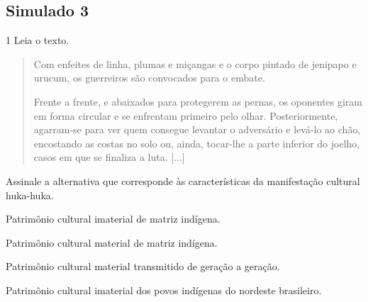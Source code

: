 \begin{escolha}

\chapter{Simulado 3}

\num{1}  Leia o texto.


\begin{quote}
Com enfeites de linha, plumas e miçangas e o corpo pintado de jenipapo e
urucum, os guerreiros são convocados para o embate.

Frente a frente, e abaixados para protegerem as pernas, os oponentes
giram em forma circular e se enfrentam primeiro pelo olhar.
Posteriormente, agarram-se para ver quem consegue levantar o adversário
e levá-lo ao chão, encostando as costas no solo ou, ainda, tocar-lhe a
parte inferior do joelho, casos em que se finaliza a luta. {[}...{]}

\end{quote}

Assinale a alternativa que corresponde às características da
manifestação cultural huka-huka.

\begin{escolha}
\item
  Patrimônio cultural imaterial de matriz indígena.
\item
  Patrimônio cultural material de matriz indígena.
\item
  Patrimônio cultural material transmitido de geração a geração.
\item
  Patrimônio cultural imaterial dos povos indígenas do nordeste
  brasileiro.
\end{escolha}


\end{escolha}
